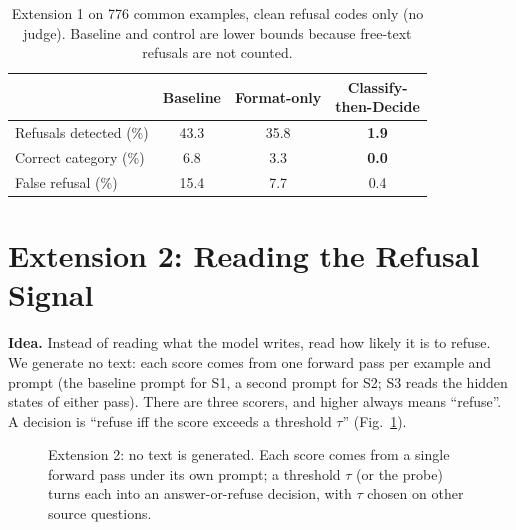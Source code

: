 \documentclass[conference]{IEEEtran}
\begin{document}
\begin{table}[t]
\centering
\caption{Extension 1 on 776 common examples, clean refusal codes only (no judge). Baseline and control are lower bounds because free-text refusals are not counted.}
\label{tab:n1}
\footnotesize
\setlength{\tabcolsep}{4pt}
\begin{tabular}{lccc}
\toprule
 & Baseline & Format-only & \shortstack{Classify-\\then-Decide} \\
\midrule
Refusals detected (\%) & 43.3 & 35.8 & \textbf{1.9} \\
Correct category (\%) & 6.8 & 3.3 & \textbf{0.0} \\
False refusal (\%) & 15.4 & 7.7 & 0.4 \\
\bottomrule
\end{tabular}
\end{table}

\section{Extension 2: Reading the Refusal Signal}
\label{sec:n2}
\textbf{Idea.} Instead of reading what the model writes, read how likely it is to refuse. We generate no text: each score comes from one forward pass per example and prompt (the baseline prompt for S1, a second prompt for S2; S3 reads the hidden states of either pass). There are three scorers, and higher always means ``refuse''. A decision is ``refuse iff the score exceeds a threshold $\tau$'' (Fig.~\ref{fig:overview}).

\begin{figure}[t]
\centering
{}
\caption{Extension 2: no text is generated. Each score comes from a single forward pass under its own prompt; a threshold $\tau$ (or the probe) turns each into an answer-or-refuse decision, with $\tau$ chosen on other source questions.}
\label{fig:overview}
\end{figure}
\end{document}
